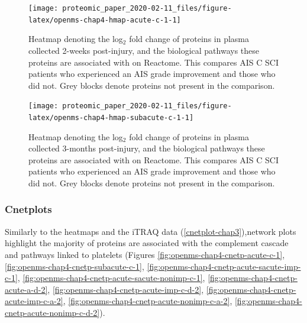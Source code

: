 \documentclass[
]{article}
\begin{document}
\begin{SidewaysFigure}



\begin{figure}

{\centering \texttt{[image: proteomic\_paper\_2020-02-11\_files/figure-latex/openms-chap4-hmap-acute-c-1-1]} 

}

\caption{Heatmap denoting the log$_2$ fold change of proteins in plasma collected 2-weeks post-injury, and the biological pathways these proteins are associated with on Reactome. This compares AIS C SCI patients who experienced an AIS grade improvement and those who did not. Grey blocks denote proteins not present in the comparison.}\label{fig:openms-chap4-hmap-acute-c-1}
\end{figure}

\end{SidewaysFigure}
\begin{SidewaysFigure}



\begin{figure}

{\centering \texttt{[image: proteomic\_paper\_2020-02-11\_files/figure-latex/openms-chap4-hmap-subacute-c-1-1]} 

}

\caption{Heatmap denoting the log$_2$ fold change of proteins in plasma collected 3-months post-injury, and the biological pathways these proteins are associated with on Reactome. This compares AIS C SCI patients who experienced an AIS grade improvement and those who did not. Grey blocks denote proteins not present in the comparison.}\label{fig:openms-chap4-hmap-subacute-c-1}
\end{figure}

\end{SidewaysFigure}
\clearpage

\hypertarget{cnetplots}{%
\subsubsection{Cnetplots}\label{cnetplots}}

Similarly to the heatmaps and the iTRAQ data (\ref{cnetplot-chap3}),network plots highlight the majority of proteins are associated with the complement cascade and pathways linked to platelets (Figures \ref{fig:openms-chap4-cnetp-acute-c-1}, \ref{fig:openms-chap4-cnetp-subacute-c-1}, \ref{fig:openms-chap4-cnetp-acute-sacute-imp-c-1}, \ref{fig:openms-chap4-cnetp-acute-sacute-nonimp-c-1}, \ref{fig:openms-chap4-cnetp-acute-a-d-2}, \ref{fig:openms-chap4-cnetp-acute-imp-c-d-2}, \ref{fig:openms-chap4-cnetp-acute-imp-c-a-2}, \ref{fig:openms-chap4-cnetp-acute-nonimp-c-a-2}, \ref{fig:openms-chap4-cnetp-acute-nonimp-c-d-2}).
\end{document}
